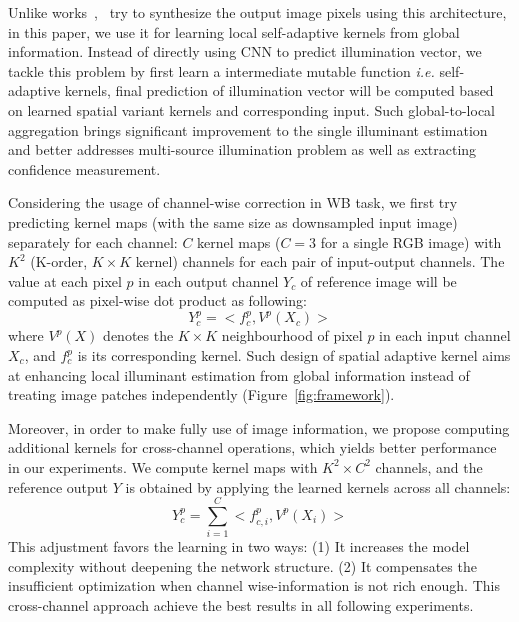\documentclass[10pt,twocolumn,letterpaper]{article}
\begin{document}
Unlike works~\cite{DBLP:journals/corr/RonnebergerFB15},~\cite{isola2017image} try to
synthesize the output image pixels using this architecture,
in this paper, we use it for learning local self-adaptive kernels from global information.
Instead of directly using CNN to predict illumination vector,
we tackle this problem by first learn a intermediate mutable function \textit{i.e.} self-adaptive kernels,
final prediction of illumination vector will be computed based on learned spatial variant kernels and corresponding input.
Such global-to-local aggregation brings significant improvement to the single illuminant estimation
and better addresses multi-source illumination problem as well as extracting confidence measurement.


Considering the usage of channel-wise correction in WB task,
we first try predicting kernel maps (with the same size as downsampled input image) separately for each channel:
$C$ kernel maps ($C=3$ for a single RGB image) with $K^2$ (K-order, $K{\times}K$ kernel) channels for each pair of input-output channels.
The value at each pixel $p$ in each output channel $Y_c$ of reference image will be computed as pixel-wise dot product as following:
\begin{equation}
Y^p_c = <f^p_c, V^p(X_c)>
\end{equation}
where $V^p(X)$ denotes the $K\times{K}$ neighbourhood of pixel $p$ in each input channel $X_c$, and $f^p_c$ is its corresponding kernel.
Such design of spatial adaptive kernel aims at enhancing local illuminant estimation from global information
instead of treating image patches independently (Figure~\ref{fig:framework}).

Moreover, in order to make fully use of image information,
we propose computing additional kernels for cross-channel operations,
which yields better performance in our experiments.
We compute kernel maps with $K^2\times{C^2}$ channels, and the reference output
$Y$ is obtained by applying the learned kernels across all channels:
\begin{equation}
Y^p_c = \sum_{i=1}^{C}<f^p_{c,i}, V^p(X_i)>
\label{eq:kpn}
\end{equation}
This adjustment favors the learning in two ways:
(1) It increases the model complexity without deepening the network structure.
(2) It compensates the insufficient optimization when channel wise-information is not rich enough.
This cross-channel approach achieve the best results in all following experiments.
\end{document}
